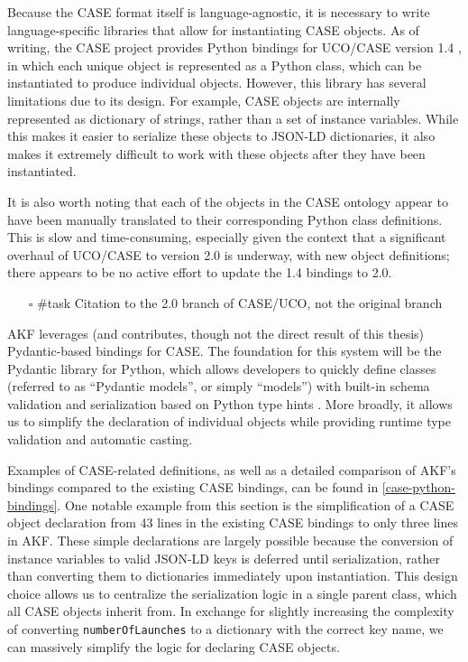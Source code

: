 Because the CASE format itself is language-agnostic, it is necessary to
write language-specific libraries that allow for instantiating CASE
objects. As of writing, the CASE project provides Python bindings for
UCO/CASE version 1.4 \cite{CaseworkCASEMappingPython}, in which each
unique object is represented as a Python class, which can be
instantiated to produce individual objects. However, this library has
several limitations due to its design. For example, CASE objects are
internally represented as dictionary of strings, rather than a set of
instance variables. While this makes it easier to serialize these
objects to JSON-LD dictionaries, it also makes it extremely difficult to
work with these objects after they have been instantiated.

It is also worth noting that each of the objects in the CASE ontology
appear to have been manually translated to their corresponding Python
class definitions. This is slow and time-consuming, especially given the
context that a significant overhaul of UCO/CASE to version 2.0 is
underway, with new object definitions; there appears to be no active
effort to update the 1.4 bindings to 2.0.

\begin{itemize}
\tightlist
\item[$\square$]
  \#task Citation to the 2.0 branch of CASE/UCO, not the original branch
\end{itemize}

AKF leverages (and contributes, though not the direct result of this
thesis) Pydantic-based bindings for CASE. The foundation for this system
will be the Pydantic library for Python, which allows developers to
quickly define classes (referred to as ``Pydantic models'', or simply
``models'') with built-in schema validation and serialization based on
Python type hints \cite{colvinPydantic2024}. More broadly, it allows
us to simplify the declaration of individual objects while providing
runtime type validation and automatic casting.

Examples of CASE-related definitions, as well as a detailed comparison
of AKF's bindings compared to the existing CASE bindings, can be found
in \autoref{case-python-bindings}. One notable
example from this section is the simplification of a CASE object
declaration from 43 lines in the existing CASE bindings to only three
lines in AKF. These simple declarations are largely possible because the
conversion of instance variables to valid JSON-LD keys is deferred until
serialization, rather than converting them to dictionaries immediately
upon instantiation. This design choice allows us to centralize the
serialization logic in a single parent class, which all CASE objects
inherit from. In exchange for slightly increasing the complexity of
converting \passthrough{\lstinline!numberOfLaunches!} to a dictionary
with the correct key name, we can massively simplify the logic for
declaring CASE objects.

